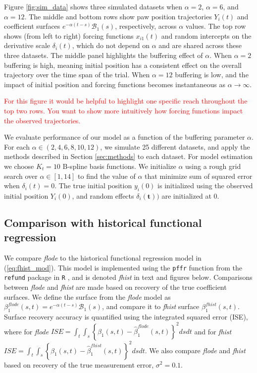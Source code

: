 \documentclass[preprint]{JASA}
\begin{document}
Figure \ref{fig:sim_data} shows three simulated datasets when
\(\alpha = 2\), \(\alpha = 6\), and \(\alpha = 12\). The middle and
bottom rows show paw position trajectories \(Y_i(t)\) and coefficient
surfaces \(e^{-\alpha (t-s)} \mathcal{B}_1(s)\), respectively, across
\(\alpha\) values. The top row shows (from left to right) forcing
functions \(x_{i1}(t)\) and random intercepts on the derivative scale
\(\delta_i(t)\), which do not depend on \(\alpha\) and are shared across
these three datasets. The middle panel highlights the buffering effect
of \(\alpha\). When \(\alpha = 2\) buffering is high, meaning initial
position has a consistent effect on the overall trajectory over the time
span of the trial. When \(\alpha = 12\) buffering is low, and the impact
of initial position and forcing functions becomes instantaneous as
\(\alpha \to \infty\).

\textcolor{red}{For this figure it would be helpful to highlight one specific reach throughout the top two rows. You want to show more intuitively how forcing functions impact the observed trajectories.}

We evaluate performance of our model as a function of the buffering
parameter \(\alpha\). For each \(\alpha \in (2, 4, 6, 8, 10, 12)\), we
simulate 25 different datasets, and apply the methods described in
Section \ref{sec:methods} to each dataset. For model estimation we
choose \(K_t = 10\) B-spline basis functions. We initialize \(\alpha\)
using a rough grid search over \(\alpha \in [1, 14]\) to find the value
of \(\alpha\) that minimize sum of squared error when
\(\delta_i(t) = 0\). The true initial position \(y_i(0)\) is initialized
using the observed initial position \(Y_i(0)\), and random effects
\(\delta_i(\mathbf{t}))\) are initialized at 0.

\hypertarget{comparison-with-historical-functional-regression}{%
\subsection{Comparison with historical functional
regression}\label{comparison-with-historical-functional-regression}}

We compare \emph{flode} to the historical functional regression model in
(\ref{eq:fhist_mod}). This model is implemented using the \texttt{pffr}
function from the \texttt{refund} package in \texttt{R} \citep{refund},
and is denoted \emph{fhist} in text and figures below. Comparisons
between \emph{flode} and \emph{fhist} are made based on recovery of the
true coefficient surfaces. We define the surface from the \emph{flode}
model as \(\beta_1^{flode}(s, t) = e^{-\alpha (t-s)} \mathcal{B}_1(s)\),
and compare it to \emph{fhist} surface \(\beta_1^{fhist}(s, t)\).
Surface recovery accuracy is quantified using the integrated squared
error (ISE), where for \emph{flode}
\(ISE = \int_t \int_s \left\{ \beta_1(s, t) - \widehat{\beta}_1^{flode}(s, t) \right\}^2 ds dt\)
and for \emph{fhist}
\(ISE = \int_t \int_s \left\{ \beta_1(s, t) - \widehat{\beta}_1^{fhist}(s, t) \right\}^2 ds dt\).
We also compare \emph{flode} and \emph{fhist} based on recovery of the
true measurement error, \(\sigma^2 = 0.1\).
\end{document}
